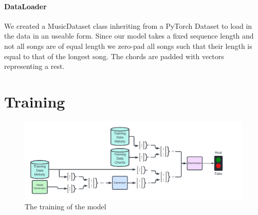 \paragraph{DataLoader} 
We created a MusicDataset class inheriting from a PyTorch Dataset to load in the data in an useable form.
Since our model takes a fixed sequence length and not all songs are of equal length we zero-pad all songs such that their length is equal to that of the longest song.
The chords are padded with vectors representing a rest.

\section{Training}

\begin{figure}
    \centering
    \includegraphics[width=\columnwidth]{Figures/GAN}
    \decoRule
    \caption{The training of the model}
    \label{fig:ModelTraining}
\end{figure}

